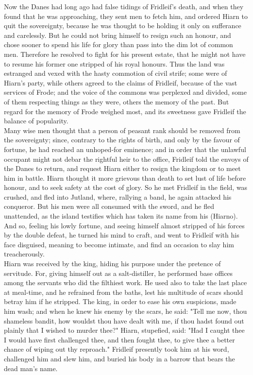 \documentclass[10pt,a4paper]{report}
\begin{document}
Now the Danes had long ago had false tidings of Fridleif's death, and when they found that he was approaching, they sent men to fetch him, and ordered Hiarn to quit the sovereignty, because he was thought to be holding it only on sufferance and carelessly. But he could not bring himself to resign such an honour, and chose sooner to spend his life for glory than pass into the dim lot of common men. Therefore he resolved to fight for his present estate, that he might not have to resume his former one stripped of his royal honours. Thus the land was estranged and vexed with the hasty commotion of civil strife; some were of Hiarn's party, while others agreed to the claims of Fridleif, because of the vast services of Frode; and the voice of the commons was perplexed and divided, some of them respecting things as they were, others the memory of the past. But regard for the memory of Frode weighed most, and its sweetness gave Fridleif the balance of popularity.\\

Many wise men thought that a person of peasant rank should be removed from the sovereignty; since, contrary to the rights of birth, and only by the favour of fortune, he had reached an unhoped-for eminence; and in order that the unlawful occupant might not debar the rightful heir to the office, Fridleif told the envoys of the Danes to return, and request Hiarn either to resign the kingdom or to meet him in battle. Hiarn thought it more grievous than death to set lust of life before honour, and to seek safety at the cost of glory. So he met Fridleif in the field, was crushed, and fled into Jutland, where, rallying a band, he again attacked his conqueror. But his men were all consumed with the sword, and he fled unattended, as the island testifies which has taken its name from his (Hiarno). And so, feeling his lowly fortune, and seeing himself almost stripped of his forces by the double defeat, he turned his mind to craft, and went to Fridleif with his face disguised, meaning to become intimate, and find an occasion to slay him treacherously.\\

Hiarn was received by the king, hiding his purpose under the pretence of servitude. For, giving himself out as a salt-distiller, he performed base offices among the servants who did the filthiest work. He used also to take the last place at meal-time, and he refrained from the baths, lest his multitude of scars should betray him if he stripped. The king, in order to ease his own suspicions, made him wash; and when he knew his enemy by the scars, he said: "Tell me now, thou shameless bandit, how wouldst thou have dealt with me, if thou hadst found out plainly that I wished to murder thee?" Hiarn, stupefied, said: "Had I caught thee I would have first challenged thee, and then fought thee, to give thee a better chance of wiping out thy reproach." Fridleif presently took him at his word, challenged him and slew him, and buried his body in a barrow that bears the dead man's name.\\
\end{document}
